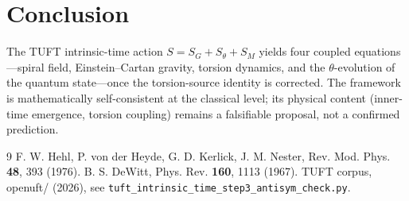 \documentclass[11pt]{article}
\begin{document}
\section{Conclusion}
\label{sec:conclusion}
The TUFT intrinsic-time action $S=S_G+S_\theta+S_M$ yields four coupled equations---spiral
field, Einstein--Cartan gravity, torsion dynamics, and the $\theta$-evolution of the quantum
state---once the torsion-source identity is corrected. The framework is mathematically
self-consistent at the classical level; its physical content (inner-time emergence, torsion
coupling) remains a falsifiable proposal, not a confirmed prediction.

\begin{thebibliography}{9}
 F. W. Hehl, P. von der Heyde, G. D. Kerlick, J. M. Nester,
  Rev. Mod. Phys. \textbf{48}, 393 (1976).
 B. S. DeWitt, Phys. Rev. \textbf{160}, 1113 (1967).
 TUFT corpus, openuft/ (2026), see \texttt{tuft\_intrinsic\_time\_step3\_antisym\_check.py}.
\end{thebibliography}
\end{document}
